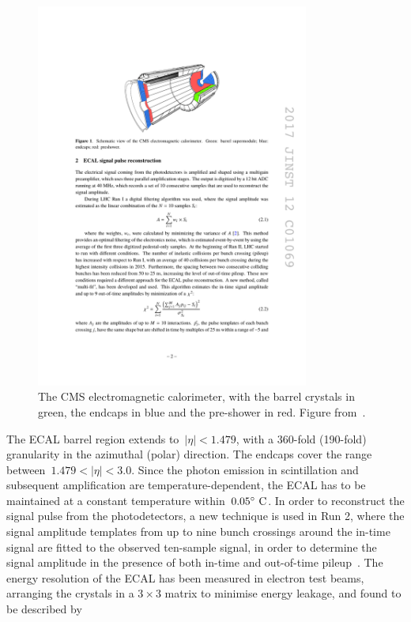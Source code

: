 \begin{figure}
\begin{centering}
\includegraphics[width=0.8\textwidth]{figures/exp/ecal.pdf}
\caption[The structure of the CMS electromagnetic calorimeter]{The CMS electromagnetic calorimeter, with the barrel crystals in green, the endcaps in blue and the pre-shower in red. Figure from~\cite{Chatrchyan:2008aa}.}
\label{fig:cms_ecal}
\end{centering}
\end{figure}

The ECAL barrel region extends to~$|\eta| < 1.479$, with a 360-fold (190-fold) granularity in the azimuthal (polar) direction. The endcaps cover the range between~$1.479 < |\eta| < 3.0$. Since the photon emission in scintillation and subsequent amplification are temperature-dependent, the ECAL has to be maintained at a constant temperature within~$0.05\degree~\mathrm{C}$. In order to reconstruct the signal pulse from the photodetectors, a new technique is used in Run 2, where the signal amplitude templates from up to nine bunch crossings around the in-time signal are fitted to the observed ten-sample signal, in order to determine the signal amplitude in the presence of both in-time and out-of-time pileup~\cite{Brianza:2017slq}. The energy resolution of the ECAL has been measured in electron test beams, arranging the crystals in a $3\times3$ matrix to minimise energy leakage, and found to be described by

